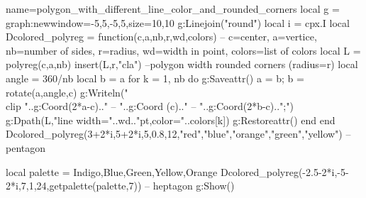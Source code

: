 \documentclass[12pt]{standalone}%
\begin{document}
\begin{luadraw}{name=polygon_with_different_line_color_and_rounded_corners}
local g = graph:new{window={-5,5,-5,5},size={10,10}}
g:Linejoin("round")
local i = cpx.I
local Dcolored_polyreg = function(c,a,nb,r,wd,colors) 
-- c=center, a=vertice, nb=number of sides, r=radius, wd=width in point, colors=list of colors
    local L = polyreg(c,a,nb)
    insert(L,{r,"cla"}) --polygon width rounded corners (radius=r)
    local angle = 360/nb
    local b = a
    for k = 1, nb do
        g:Saveattr()
        a = b; b = rotate(a,angle,c)
        g:Writeln("\\clip "..g:Coord(2*a-c).." -- "..g:Coord (c).." -- "..g:Coord(2*b-c)..";")
        g:Dpath(L,"line width="..wd.."pt,color="..colors[k])
        g:Restoreattr()
    end
end
Dcolored_polyreg(3+2*i,5+2*i,5,0.8,12,{"red","blue","orange","green","yellow"}) -- pentagon

local palette = {Indigo,Blue,Green,Yellow,Orange}
Dcolored_polyreg(-2.5-2*i,-5-2*i,7,1,24,getpalette(palette,7))  -- heptagon
g:Show()
\end{luadraw}
\end{document}
